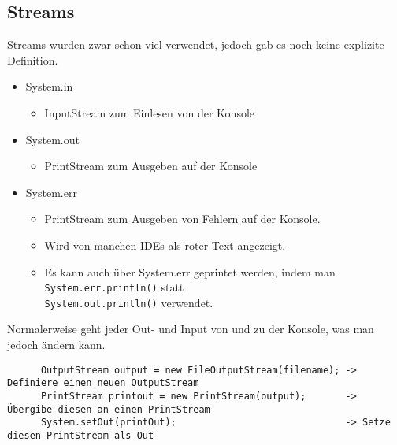 \documentclass{article}
\begin{document}
	  \subsection{Streams}
	  Streams wurden zwar schon viel verwendet, jedoch gab es noch keine explizite Definition.
	  \begin{itemize}
	  	\item{System.in}
	  	\begin{itemize}
	  		\item{InputStream zum Einlesen von der Konsole}
	  	\end{itemize}
	  	\item{System.out}
	  	\begin{itemize}
	  		\item{PrintStream zum Ausgeben auf der Konsole}
	  	\end{itemize}
	  	\item{System.err}
	  	\begin{itemize}
	  		\item{PrintStream zum Ausgeben von Fehlern auf der Konsole.}
	  		\item{Wird von manchen IDEs als roter Text angezeigt.}
	  		\item{Es kann auch über System.err geprintet werden, indem man \verb|System.err.println()| statt\\ \verb|System.out.println()| verwendet.}
	  	\end{itemize}
	  \end{itemize}
	  Normalerweise geht jeder Out- und Input von und zu der Konsole, was man jedoch ändern kann.
	  \begin{verbatim}
	  OutputStream output = new FileOutputStream(filename); -> Definiere einen neuen OutputStream
	  PrintStream printout = new PrintStream(output);       -> Übergibe diesen an einen PrintStream
	  System.setOut(printOut);                              -> Setze diesen PrintStream als Out
	  \end{verbatim}
	      
\end{document}
